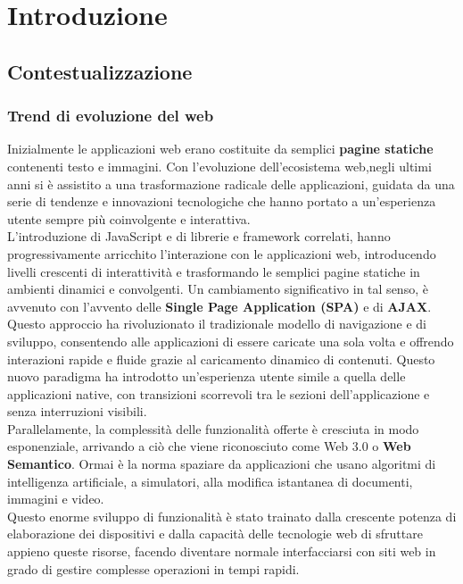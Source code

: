 \chapter{Introduzione}
\label{chap:1}

\section{Contestualizzazione}
\label{sec:Contestualizzazione}

\subsection{Trend di evoluzione del web}
Inizialmente le applicazioni web erano costituite da semplici \textbf{pagine statiche} contenenti testo e immagini.
Con l'evoluzione dell'ecosistema web,negli ultimi anni si è assistito a una trasformazione radicale delle applicazioni, guidata da una serie di tendenze e innovazioni tecnologiche che hanno portato a un'esperienza utente sempre più coinvolgente e interattiva.
\\L'introduzione di JavaScript e di librerie e framework correlati, hanno progressivamente arricchito l'interazione con le applicazioni web, introducendo livelli crescenti di interattività e trasformando le semplici pagine statiche in ambienti dinamici e convolgenti. 
Un cambiamento significativo in tal senso, è avvenuto con l'avvento delle \textbf{Single Page Application (SPA)} e di \textbf{AJAX}.
Questo approccio ha rivoluzionato il tradizionale modello di navigazione e di sviluppo, consentendo alle applicazioni di essere caricate una sola volta e offrendo interazioni rapide e fluide grazie al caricamento dinamico di contenuti. Questo nuovo paradigma ha introdotto un'esperienza utente simile a quella delle applicazioni native, con transizioni scorrevoli tra le sezioni dell'applicazione e senza interruzioni visibili.
\\Parallelamente, la complessità delle funzionalità offerte è cresciuta in modo esponenziale, arrivando a ciò che viene riconosciuto come Web 3.0 o \textbf{Web Semantico}. Ormai è la norma spaziare da applicazioni che usano algoritmi di intelligenza artificiale, a simulatori, alla modifica istantanea di documenti, immagini e video.
\\Questo enorme sviluppo di funzionalità è stato trainato dalla crescente potenza di elaborazione dei dispositivi e dalla capacità delle tecnologie web di sfruttare appieno queste risorse, facendo diventare normale interfacciarsi con siti web in grado di gestire complesse operazioni in tempi rapidi.

